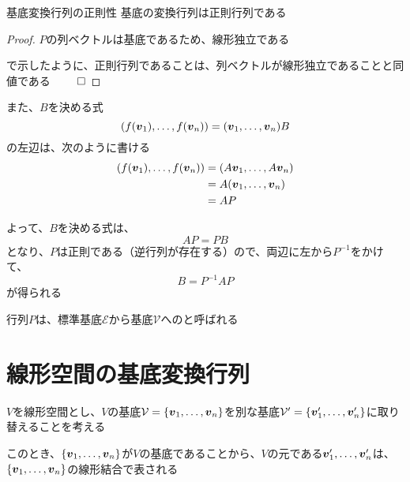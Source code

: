 \documentclass[../../../topic_linear-algebra]{subfiles}
\begin{document}
\begin{theorem*}{基底変換行列の正則性}
  基底の変換行列は正則行列である
\end{theorem*}

\begin{proof}
  $P$の列ベクトルは基底であるため、線形独立である

  で示したように、正則行列であることは、列ベクトルが線形独立であることと同値である $\qed$
\end{proof}

また、$B$を決める式
\begin{equation*}
  (f(\vb*{v}_1), \ldots, f(\vb*{v}_n)) = (\vb*{v}_1, \ldots, \vb*{v}_n) B
\end{equation*}
の左辺は、次のように書ける
\begin{align*}
  (f(\vb*{v}_1), \ldots, f(\vb*{v}_n)) & = (A\vb*{v}_1, \ldots, A\vb*{v}_n) \\
                                       & = A (\vb*{v}_1, \ldots, \vb*{v}_n) \\
                                       & = A P
\end{align*}

よって、$B$を決める式は、
\begin{equation*}
  AP = PB
\end{equation*}
となり、$P$は正則である（逆行列が存在する）ので、両辺に左から$P^{-1}$をかけて、
\begin{equation*}
  B = P^{-1} A P
\end{equation*}
が得られる

\br

行列$P$は、標準基底$\mathcal{E}$から基底$\mathcal{V}$へのと呼ばれる

\sectionline
\section{線形空間の基底変換行列}

$V$を線形空間とし、$V$の基底$\mathcal{V} = \{\vb*{v}_1, \ldots, \vb*{v}_n\}$を別な基底$\mathcal{V}' = \{\vb*{v}'_1, \ldots, \vb*{v}'_n\}$に取り替えることを考える

\br

このとき、$\{\vb*{v}_1, \ldots, \vb*{v}_n\}$が$V$の基底であることから、$V$の元である$\vb*{v}'_1, \ldots, \vb*{v}'_n$は、$\{\vb*{v}_1, \ldots, \vb*{v}_n\}$の線形結合で表される
\end{document}
